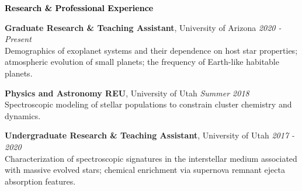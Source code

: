 \documentclass{resume} %
\newcommand{\mystrut}{\rule[-.3\baselineskip]{0pt}{\baselineskip}}
\renewenvironment{rSection}[1]{\mystrut{\textcolor{black}{{\large{\textbf{#1}}}}}
\vspace{-5pt} %
\begin{list}{}{
\setlength{\leftmargin}{0em}
}
\item[]
}{
\end{list}
}
\begin{document}


\begin{rSection}{Research \& Professional Experience} 


{\bf Graduate Research \& Teaching Assistant}, University of Arizona \hfill {\em 2020 - Present} \\
{Demographics of exoplanet systems and their dependence on host star properties; atmospheric evolution of small planets; the frequency of Earth-like habitable planets.}\vspace{-5pt}

{\bf Physics and Astronomy REU}, University of Utah \hfill {\em Summer 2018} \\
{Spectroscopic modeling of stellar populations to constrain cluster chemistry and dynamics.}\vspace{-5pt}

{\bf Undergraduate Research \& Teaching Assistant}, University of Utah \hfill {\em 2017 - 2020} \\
{Characterization of spectroscopic signatures in the interstellar medium associated with massive evolved stars; chemical enrichment via supernova remnant ejecta absorption features.}
\end{rSection}
\vspace{5pt}\hline
\vspace{0pt}


\end{document}
